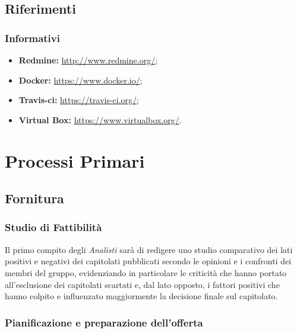 \documentclass{scalatekids-article}
\begin{document}
\prodPurpose{}
\glossExpl{}

\subsection{Riferimenti}

\subsubsection{Informativi}

\begin{itemize}
\item\textbf{Redmine:} \url{http://www.redmine.org/};
\item\textbf{Docker:} \url{https://www.docker.io/};
\item\textbf{Travis-ci:} \url{https://travis-ci.org/};
\item\textbf{Virtual Box:} \url{https://www.virtualbox.org/}.
\end{itemize}

\section{Processi Primari}

\subsection{Fornitura}

\subsubsection{Studio di Fattibilità}

Il primo compito degli \textit{Analisti} sarà di redigere uno studio comparativo
dei lati positivi e negativi dei capitolati pubblicati secondo le opinioni e i
confronti dei membri del gruppo, evidenziando in particolare le criticità che
hanno portato all'esclusione dei capitolati scartati e, dal lato opposto, i
fattori positivi che hanno colpito e influenzato maggiormente la decisione
finale sul capitolato.

\subsubsection{Pianificazione e preparazione dell'offerta}
\end{document}
